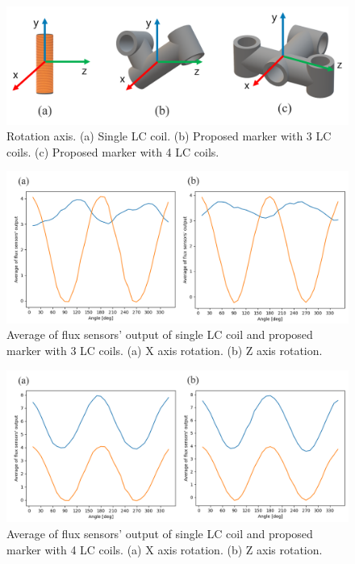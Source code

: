 \documentclass[journal,twoside,web]{ieeecolor}
\begin{document}
\begin{figure}[!t]
    \centerline{\includegraphics[width=\columnwidth]{figure/rotation-define3.png}}
    \caption{Rotation axis. (a) Single LC coil. (b) Proposed marker with 3 LC coils. (c) Proposed marker with 4 LC coils.}
    \label{rotation-define}
\end{figure}

\begin{figure}[!t]
    \centerline{\includegraphics[width=\columnwidth]{figure/angle_characteristics_3LC.png}}
    \caption{Average of flux sensors' output of single LC coil and proposed marker with 3 LC coils. (a) X axis rotation. (b) Z axis rotation.}
    \label{angle_characteristics_3LC}
\end{figure}
\begin{figure}[!t]
    \centerline{\includegraphics[width=\columnwidth]{figure/angle_characteristics_4LC.png}}
    \caption{Average of flux sensors' output of single LC coil and proposed marker with 4 LC coils. (a) X axis rotation. (b) Z axis rotation.}
    \label{angle_characteristics_4LC}
\end{figure}
\end{document}
